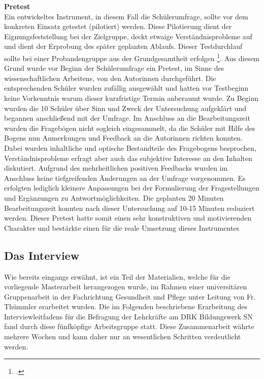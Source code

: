 \textbf{Pretest}\\
Ein entwickeltes Instrument, in diesem Fall die Schülerumfrage, sollte vor dem konkreten Einsatz getestet (pilotiert) werden. Diese Pilotierung dient der Eignungsfeststellung bei der Zielgruppe, deckt etwaige Verständnisprobleme auf und dient der Erprobung des später geplanten Ablaufs. Dieser Testdurchlauf sollte bei einer Probandengruppe aus der Grundgesamtheit erfolgen \footcite[vgl.][275]{Krueger2014}. Aus diesem Grund wurde vor Beginn der Schülerumfrage ein Pretest, im  Sinne des wissenschaftlichen Arbeitens, von den Autorinnen durchgeführt. Die entsprechenden Schüler wurden zufällig ausgewählt und hatten vor Testbeginn keine Vorkenntnis warum dieser kurzfristige Termin anberaumt wurde. Zu Beginn wurden die 10 Schüler über Sinn und Zweck der Untersuchung aufgeklärt und begannen anschließend mit der Umfrage. Im Anschluss an die Bearbeitungszeit wurden die Fragebögen nicht sogleich eingesammelt, da die Schüler mit Hilfe des Bogens nun Anmerkungen und Feedback an die Autorinnen richten konnten. Dabei wurden inhaltliche und optische Bestandteile des Fragebogens besprochen, Verständnisprobleme erfragt aber auch das subjektive Interesse an den Inhalten diskutiert. Aufgrund des mehrheitlichen positiven Feedbacks wurden im Anschluss keine tiefgreifenden Änderungen an der Umfrage vorgenommen. Es erfolgten lediglich kleinere Anpassungen bei der Formulierung der Fragestellungen und Ergänzungen zu Antwortmöglichkeiten. Die geplanten 20 Minuten Bearbeitungszeit konnten nach dieser Untersuchung auf 10-15 Minuten reduziert werden. Dieser Pretest hatte somit einen sehr konstruktiven und motivierenden Charakter und bestärkte einen für die reale Umsetzung dieses Instrumentes

\subsection{Das Interview}
\label{sec:DasInterview}

Wie bereits eingangs erwähnt, ist ein Teil der Materialien, welche für die vorliegende Masterarbeit herangezogen wurde, im Rahmen einer universitären Gruppenarbeit in der Fachrichtung Gesundheit und Pflege unter Leitung von Fr. Thümmler erarbeitet wurden. Die im Folgenden beschriebene Erarbeitung des Interviewleitfadens für die Befragung der Lehrkräfte am DRK Bildungswerk SN fand durch diese fünfköpfige Arbeitsgruppe statt. Diese Zusammenarbeit währte mehrere Wochen und kann daher nur an wesentlichen Schritten verdeutlicht werden.

